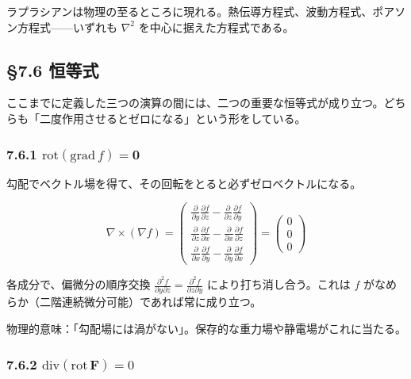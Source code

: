 \documentclass[a4paper,12pt,openany]{book}
\begin{document}
ラプラシアンは物理の至るところに現れる。熱伝導方程式、波動方程式、ポアソン方程式——いずれも
\(\nabla^2\) を中心に据えた方程式である。

\par\vspace{0.35em}\par

\hypertarget{ux6052ux7b49ux5f0f}{%
\subsection{§7.6 恒等式}\label{ux6052ux7b49ux5f0f}}

ここまでに定義した三つの演算の間には、二つの重要な恒等式が成り立つ。どちらも「二度作用させるとゼロになる」という形をしている。

\hypertarget{mathrmrotmathrmgradf-mathbf0}{%
\subsubsection{\texorpdfstring{7.6.1
\(\mathrm{rot}(\mathrm{grad}\,f) = \mathbf{0}\)}{7.6.1 \textbackslash mathrm\{rot\}(\textbackslash mathrm\{grad\}\textbackslash,f) = \textbackslash mathbf\{0\}}}\label{mathrmrotmathrmgradf-mathbf0}}

勾配でベクトル場を得て、その回転をとると必ずゼロベクトルになる。

\[\nabla \times (\nabla f) = \begin{pmatrix}
\frac{\partial}{\partial y}\frac{\partial f}{\partial z} - \frac{\partial}{\partial z}\frac{\partial f}{\partial y} \\[0.5em]
\frac{\partial}{\partial z}\frac{\partial f}{\partial x} - \frac{\partial}{\partial x}\frac{\partial f}{\partial z} \\[0.5em]
\frac{\partial}{\partial x}\frac{\partial f}{\partial y} - \frac{\partial}{\partial y}\frac{\partial f}{\partial x}
\end{pmatrix} = \begin{pmatrix} 0 \\ 0 \\ 0 \end{pmatrix}\]

各成分で、偏微分の順序交換
\(\frac{\partial^2 f}{\partial y\partial z} = \frac{\partial^2 f}{\partial z\partial y}\)
により打ち消し合う。これは \(f\)
がなめらか（二階連続微分可能）であれば常に成り立つ。

物理的意味：「勾配場には渦がない」。保存的な重力場や静電場がこれに当たる。

\hypertarget{mathrmdivmathrmrotmathbff-0}{%
\subsubsection{\texorpdfstring{7.6.2
\(\mathrm{div}(\mathrm{rot}\,\mathbf{F}) = 0\)}{7.6.2 \textbackslash mathrm\{div\}(\textbackslash mathrm\{rot\}\textbackslash,\textbackslash mathbf\{F\}) = 0}}\label{mathrmdivmathrmrotmathbff-0}}
\end{document}
